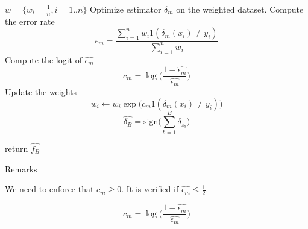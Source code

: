 \documentclass[usenames,dvipsnames]{beamer}
\newcommand\Fontvi{\fontsize{8}{8}\selectfont}
\begin{document}
\begin{frame}

\begin{algorithm}[H]
\Fontvi
	 $w = \{w_i=\frac{1}{n}, i=1..n  \}$\;
 	{
	    Optimize estimator $\delta_m$ on the weighted dataset.
	    Compute the error rate
	    \begin{equation}
		\hat{\epsilon_m} = \frac{ \sum^{n}_{i=1} w_i 1( \delta_m(x_i)\neq y_i)}{ \sum^{n}_{i=1} w_i}
	    \end{equation}
	    Compute the logit of $\hat{\epsilon_m}$
	    \begin{equation}
		c_m = \log \big( \frac{1- \hat{\epsilon_m}}{ \hat{\epsilon_m}} \big) 
	    \end{equation}
	    Update the weights
	    \begin{equation}
		w_i \leftarrow w_i \exp\Big(c_m 1( \delta_m(x_i)\neq y_i) \Big)
	    \end{equation}
  	}
	    \begin{equation}
		\hat{\delta_B} = \text{sign} \Big(\sum^{B}_{b=1} \delta_{z_b}\Big)
	    \end{equation}
	
	
	return $ \hat{f_B}$
	\caption{Adaboost for binary classification (adaptive boosting)}
\end{algorithm}
    
\end{frame}

\begin{frame}{Remarks}

    We need to enforce that $c_m \geq 0$. It is verified if $\hat{\epsilon_m} \leq \frac{1}{2} $.

    \begin{equation}
        c_m = \log \big( \frac{1- \hat{\epsilon_m}}{ \hat{\epsilon_m}} \big) 
    \end{equation}
    
\end{frame}
\end{document}
